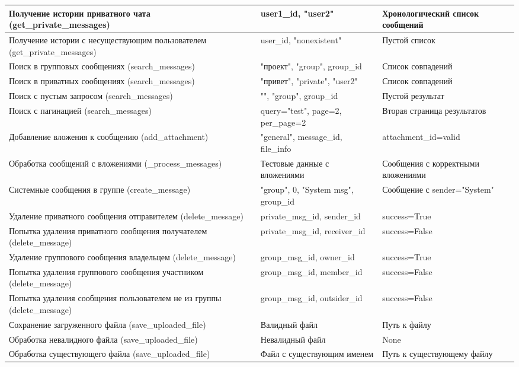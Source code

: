\begin{xltabular}{\linewidth}{|X|X|X|}
	Получение истории приватного чата (get\_private\_messages) & user1\_id, "user2" & Хронологический список сообщений \\ \hline
	Получение истории с несуществующим пользователем (get\_private\_messages) & user\_id, "nonexistent" & Пустой список \\ \hline
	Поиск в групповых сообщениях (search\_messages) & "проект", "group", group\_id & Список совпадений \\ \hline
	Поиск в приватных сообщениях (search\_messages) & "привет", "private", "user2" & Список совпадений \\ \hline
	Поиск с пустым запросом (search\_messages) & "", "group", group\_id & Пустой результат \\ \hline
	Поиск с пагинацией (search\_messages) & query="test", page=2, per\_page=2 & Вторая страница результатов \\ \hline
	Добавление вложения к сообщению (add\_attachment) & "general", message\_id, file\_info & attachment\_id=valid \\ \hline
	Обработка сообщений с вложениями (\_process\_messages) & Тестовые данные с вложениями & Сообщения с корректными вложениями \\ \hline
	Системные сообщения в группе (create\_message) & "group", 0, "System msg", group\_id & Сообщение с sender="System" \\ \hline
	Удаление приватного сообщения отправителем (delete\_message) & private\_msg\_id, sender\_id & success=True \\ \hline
	Попытка удаления приватного сообщения получателем (delete\_message) & private\_msg\_id, receiver\_id & success=False \\ \hline
	Удаление группового сообщения владельцем (delete\_message) & group\_msg\_id, owner\_id & success=True \\ \hline
	Попытка удаления группового сообщения участником (delete\_message) & group\_msg\_id, member\_id & success=False \\ \hline
	Попытка удаления сообщения пользователем не из группы (delete\_message) & group\_msg\_id, outsider\_id & success=False \\ \hline
	Сохранение загруженного файла (save\_uploaded\_file) & Валидный файл & Путь к файлу \\ \hline
	Обработка невалидного файла (save\_uploaded\_file) & Невалидный файл & None \\ \hline
	Обработка существующего файла (save\_uploaded\_file) & Файл с существующим именем & Путь к существующему файлу \\ \hline
\end{xltabular}

